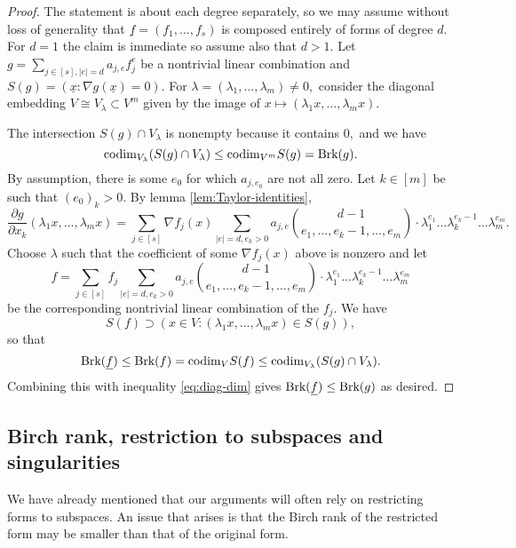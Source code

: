 \documentclass[12pt]{amsart}
\let\ul\underline
\theoremstyle{definition}
\newcommand{\codim}{\textnormal{codim}}
\newcommand{\brk}{\textnormal{Brk}}
\let\ul\underline
\begin{document}
\begin{proof}
    The statement is about each degree separately, so we may assume without loss of generality that $\ul{f}=(f_1,\ldots,f_s)$ is composed entirely of forms of degree $d.$ For $d=1$ the claim is immediate so assume also that $d>1.$ Let $g = \sum_{j\in [s], |e| = d} a_{j,e}f^e_j $ be a nontrivial linear combination and $S(g) = (\ul{x}: \nabla g(\ul{x}) = 0).$  For $\lambda = (\lambda_1,\ldots,\lambda_m) \neq 0,$ consider the diagonal embedding $V\cong V_\lambda \subset V^m$ given by the image of  $x\mapsto (\lambda_1 x,\ldots,\lambda_m x).$ 
    
    The intersection $S(g)\cap V_\lambda$ is nonempty because it contains $0,$ and we have
    \begin{equation}\label{eq:diag-dim}
        \codim_{V_\lambda} (S(g)\cap V_\lambda) \le \codim_{V^m} S(g) = \brk(g). 
    \end{equation}
    By assumption, there is some $e_0$ for which $a_{j,e_0}$ are not all zero. Let $k\in [m]$ be such that $(e_0)_k>0.$ By lemma \ref{lem:Taylor-identities}, 
    \[
    \frac{\partial g}{\partial x_k} (\lambda_1 x,\ldots,\lambda_m x) = \sum_{j\in [s]} \nabla f_j(x) \sum_{|e|=d, e_k>0} a_{j,e} \binom{d-1}{e_1,\ldots,e_k-1,\ldots,e_m} \cdot \lambda_1^{e_1}\ldots\lambda_k^{e_k-1}\ldots\lambda_m^{e_m} .
    \]
    Choose $\lambda$ such that the coefficient of some $\nabla f_j(x)$ above is nonzero and let 
    \[
    f = \sum_{j\in [s]} f_j \sum_{|e|=d, e_k>0} a_{j,e} \binom{d-1}{e_1,\ldots,e_k-1,\ldots,e_m} \cdot \lambda_1^{e_1}\ldots\lambda_k^{e_k-1}\ldots\lambda_m^{e_m}
    \]
    be the corresponding nontrivial linear combination of the $f_j.$ We have 
    \[
    S(f)\supset (x\in V: (\lambda_1 x,\ldots,\lambda_m x) \in S(g)) , 
    \]
    so that
    \[
    \brk(\ul{f}) \le \brk(f) = \codim_V S(f) \le \codim_{V_\lambda} (S(g)\cap V_\lambda).
    \]
    Combining this with inequality \eqref{eq:diag-dim} gives $\brk(\ul{f}) \le \brk(g)$ as desired.
\end{proof}

\subsection{Birch rank, restriction to subspaces and singularities}

We have already mentioned that our arguments will often rely on restricting forms to subspaces. An issue that arises is that the Birch rank of the restricted form may be smaller than that of the original form. 
\end{document}
